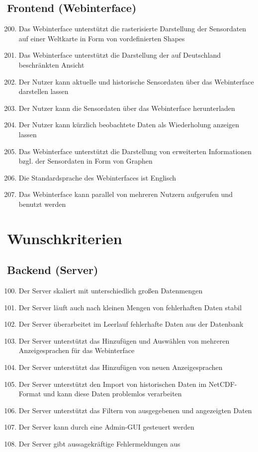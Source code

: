 \subsection{Frontend (Webinterface)}
\begin{enumerate}[label=\textbf{MK\arabic{enumi}0}]
	\setcounter{enumi}{199}
	\item Das Webinterface unterstützt die rasterisierte Darstellung der Sensordaten auf einer Weltkarte in Form von vordefinierten Shapes
	\item Das Webinterface unterstützt die Darstellung der auf Deutschland beschränkten Ansicht
	\item Der Nutzer kann aktuelle und historische Sensordaten über das Webinterface darstellen lassen
	\item Der Nutzer kann die Sensordaten über das Webinterface herunterladen
	\item Der Nutzer kann kürzlich beobachtete Daten als Wiederholung anzeigen lassen
	\item Das Webinterface unterstützt die Darstellung von erweiterten Informationen bzgl. der Sensordaten in Form von Graphen
	\item Die Standardsprache des Webinterfaces ist Englisch
	\item Das Webinterface kann parallel von mehreren Nutzern aufgerufen und benutzt werden
\end{enumerate}

\section{Wunschkriterien}
\subsection{Backend (Server)}
\begin{enumerate}[label=\textbf{WK\arabic{enumi}0}]
	\setcounter{enumi}{99}
	\item Der Server skaliert mit unterschiedlich großen Datenmengen
	\item Der Server läuft auch nach kleinen Mengen von fehlerhaften Daten stabil
	\item Der Server überarbeitet im Leerlauf fehlerhafte Daten aus der Datenbank
	\item Der Server unterstützt das Hinzufügen und Auswählen von mehreren Anzeigesprachen für das Webinterface
	\item Der Server unterstützt das Hinzufügen von neuen Anzeigesprachen
	\item Der Server unterstützt den Import von historischen Daten im NetCDF-Format und kann diese Daten problemlos verarbeiten
	\item Der Server unterstützt das Filtern von ausgegebenen und angezeigten Daten
	\item Der Server kann durch eine Admin-GUI gesteuert werden
	\item Der Server gibt aussagekräftige Fehlermeldungen aus
\end{enumerate}
